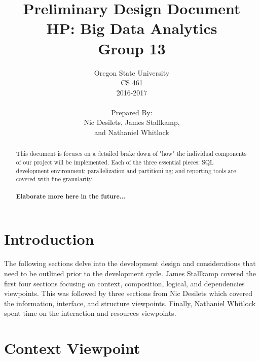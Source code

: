 \documentclass[draftclsnofoot, onecolumn, compsoc, 10pt]{IEEEtran}
\title{\Huge Preliminary Design Document\\\large HP: Big Data Analytics\\Group 13}
\author{Oregon State University\\CS 461\\2016-2017\\\\Prepared By:\\Nic Desilets, James Stallkamp,\\and Nathaniel Whitlock}
\begin{document}
\begin{titlingpage}
    \maketitle 
    
    \vspace{1in}
    \begin{abstract}
		\noindent This document is focuses on a detailed brake down of "how" the individual components of our project will be implemented.
        Each of the three essential pieces: SQL development environment; parallelization and partitioni ng; and reporting tools are covered with fine granularity.\\\\
        \textbf{Elaborate more here in the future...}
        
    \end{abstract}
\end{titlingpage}

{\small\tableofcontents} %
\pagebreak

\section{Introduction}
The following sections delve into the development design and considerations that need to be outlined prior to the development cycle.
James Stallkamp covered the first four sections focusing on context, composition, logical, and dependencies viewpoints.
This was followed by three sections from Nic Desilets which covered the information, interface, and structure viewpoints.
Finally, Nathaniel Whitlock spent time on the interaction and resources viewpoints.


\section{Context Viewpoint}
\end{document}
